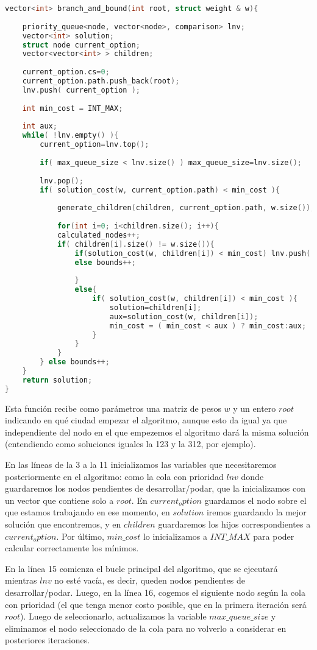 \documentclass[11pt]{article}
\begin{document}
\begin{lstlisting}[language=C++, caption=Algoritmo Branch and Bound]
vector<int> branch_and_bound(int root, struct weight & w){
	
	priority_queue<node, vector<node>, comparison> lnv;
	vector<int> solution; 
	struct node current_option;
	vector<vector<int> > children;
	
	current_option.cs=0;
	current_option.path.push_back(root);
	lnv.push( current_option );
	
	int min_cost = INT_MAX; 
	
	int aux;
	while( !lnv.empty() ){
		current_option=lnv.top();
		
		if( max_queue_size < lnv.size() ) max_queue_size=lnv.size(); 
		
		lnv.pop();
		if( solution_cost(w, current_option.path) < min_cost ){
			
			generate_children(children, current_option.path, w.size());
			
			for(int i=0; i<children.size(); i++){
			calculated_nodes++;
			if( children[i].size() != w.size()){			
				if(solution_cost(w, children[i]) < min_cost) lnv.push( node(possible_cost(w, children[i]), children[i]) );
				else bounds++;
				
				}   
				else{
					if( solution_cost(w, children[i]) < min_cost ){
						solution=children[i];
						aux=solution_cost(w, children[i]);
						min_cost = ( min_cost < aux ) ? min_cost:aux;
					}
				}
			}
		} else bounds++;
	}
	return solution;
}
\end{lstlisting}
\newpage
Esta función recibe como parámetros una matriz de pesos $w$ y un entero $root$ indicando en qué ciudad empezar el algoritmo, aunque esto da igual ya que independiente del nodo en el que empezemos el algoritmo dará la misma solución (entendiendo como soluciones iguales la 123 y la 312, por ejemplo).

En las líneas de la 3 a la 11 inicializamos las variables que necesitaremos posteriormente en el algoritmo: como la cola con prioridad $lnv$ donde guardaremos los nodos pendientes de desarrollar/podar, que la inicializamos con un vector que contiene solo a $root$. En $current_option$ guardamos el nodo sobre el que estamos trabajando en ese momento, en $solution$ iremos guardando la mejor solución que encontremos, y en $children$ guardaremos los hijos correspondientes a $current_option$. Por último, $min\_cost$ lo inicializamos a $INT\_MAX$ para poder calcular correctamente los mínimos.

En la línea 15 comienza el bucle principal del algoritmo, que se ejecutará mientras $lnv$ no esté vacía, es decir, queden nodos pendientes de desarrollar/podar. Luego, en la línea 16, cogemos el siguiente nodo según la cola con prioridad (el que tenga menor costo posible, que en la primera iteración será $root$). Luego de seleccionarlo, actualizamos la variable $max\_queue\_size$ y eliminamos el nodo seleccionado de la cola para no volverlo a considerar en posteriores iteraciones.
\end{document}
